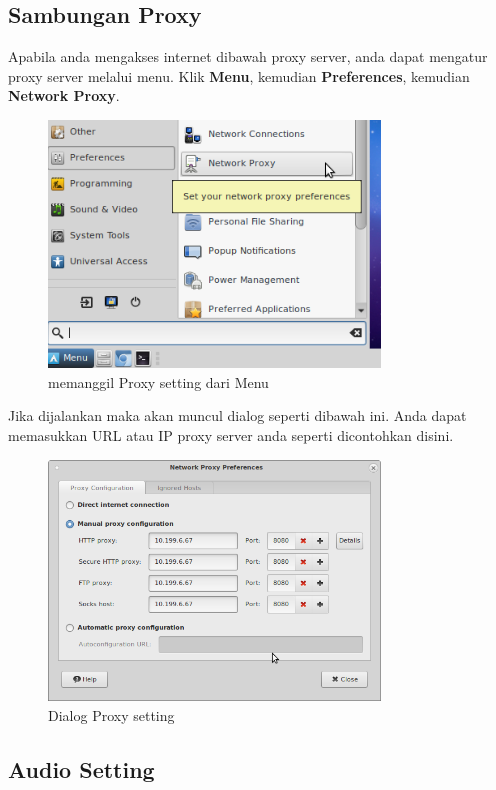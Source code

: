 \documentclass[12pt,]{article}
\begin{document}
	\newpage
	
	\subsection{Sambungan Proxy}
	
	Apabila anda mengakses internet dibawah proxy server, anda dapat mengatur proxy server melalui menu.
	Klik \textbf{Menu}, kemudian \textbf{Preferences}, kemudian \textbf{Network Proxy}. 
	
	\begin{figure}[!ht]
		\centering
		\includegraphics[width=250pt]{png/menuproxy}
		\caption{memanggil Proxy setting dari Menu}
	\end{figure}

	Jika dijalankan maka akan muncul dialog seperti dibawah ini.
	Anda dapat memasukkan URL atau IP proxy server anda seperti dicontohkan disini.
	
	\begin{figure}[!ht]
		\centering
		\includegraphics[width=250pt]{png/proxydlg}
		\caption{Dialog Proxy setting}
	\end{figure}
	
	\newpage
	
	\subsection{Audio Setting}
	
\end{document}
